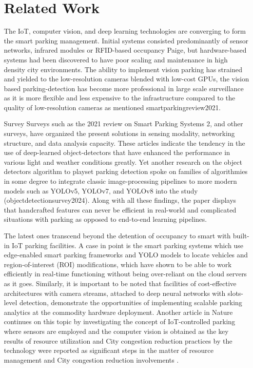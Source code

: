 \documentclass[conference]{IEEEtran}
\begin{document}
\section{Related Work}
The IoT, computer vision, and deep learning technologies are converging to form the smart parking management. Initial systems consisted predominantly of sensor networks, infrared modules or RFID-based occupancy Paige, but hardware-based systems had been discovered to have poor scaling and maintenance in high density city environments. The ability to implement vision parking has strained and yielded to the low-resolution cameras blended with low-cost GPUs, the vision based parking-detection has become more professional in large scale surveillance as it is more flexible and less expensive to the infrastructure compared to the quality of low-resolution cameras as mentioned smartparkingreview2021.

Survey Surveys such as the 2021 review on Smart Parking Systems 2, and other surveys, have organized the present solutions in sensing modality, networking structure, and data analysis capacity. These articles indicate the tendency in the use of deep-learned object-detectors that have enhanced the performance in various light and weather conditions greatly. Yet another research on the object detectors algorithm to playset parking detection spoke on families of algorithmies in some degree to integrate classic image-processing pipelines to more modern models such as YOLOv5, YOLOv7, and YOLOv8 into the study (objectdetectionsurvey2024). Along with all these findings, the paper displays that handcrafted features can never be efficient in real-world and complicated situations with parking as opposed to end-to-end learning pipelines.

The latest ones transcend beyond the detention of occupancy to smart with built-in IoT parking facilities. A case in point is the smart parking systems which use edge-enabled smart parking frameworks and YOLO models to locate vehicles and region-of-interest (ROI) modifications, which have shown to be able to work efficiently in real-time functioning without being over-reliant on the cloud servers as it goes. Similarly, it is important to be noted that facilities of cost-effective architectures with camera streams, attached to deep neural networks with slots-level detection, demonstrate the opportunities of implementing scalable parking analytics at the commodity hardware deployment. Another article in Nature continues on this topic by investigating the concept of IoT-controlled parking where sensors are employed and the computer vision is obtained as the key results of resource utilization and City congestion reduction practices by the technology were reported as significant steps in the matter of resource management and City congestion reduction involvements \cite{natureiotparking2025}.
\end{document}
